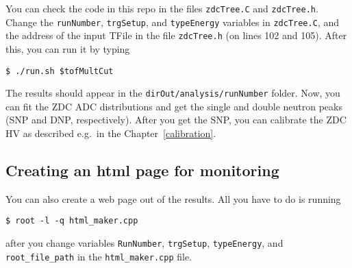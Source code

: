 You can check the code in this repo in the files
\texttt{zdcTree.C} and \texttt{zdcTree.h}. Change the \texttt{runNumber}, \texttt{trgSetup},
and \texttt{typeEnergy} variables in \texttt{zdcTree.C}, and
the address of the input TFile in the file \texttt{zdcTree.h} (on lines 102 and 105). After this, you can run it by
typing
\begin{verbatim}
$ ./run.sh $tofMultCut
\end{verbatim}
The results should appear in the \texttt{dirOut/analysis/runNumber} folder. Now, you can fit the ZDC ADC distributions
and get the single and double neutron peaks (SNP and DNP, respectively). After you get the SNP, you can calibrate
the ZDC HV as described e.g.\ in the Chapter~\ref{calibration}.

\subsection{Creating an html page for monitoring}\hypertarget{creating-html-page-for-monitoring}{}\label{creating-html-page-for-monitoring}

You can also create a web page out of the results. All you have to do is running
\begin{verbatim}
$ root -l -q html_maker.cpp
\end{verbatim}
after you change variables \texttt{RunNumber}, \texttt{trgSetup}, \texttt{typeEnergy}, 
and \texttt{root\_file\_path} in the \texttt{html\_maker.cpp} file.


